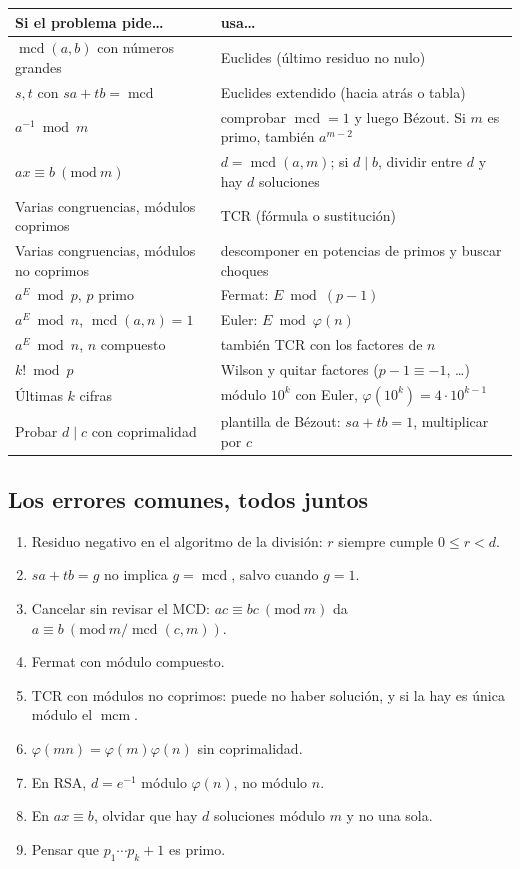 \documentclass[11pt,a4paper]{article}
\theoremstyle{definition}
\newcommand{\md}[1]{\ (\mathrm{mod}\ #1)}
\newcommand{\mcd}{\operatorname{mcd}}
\newcommand{\mcm}{\operatorname{mcm}}
\theoremstyle{notait}
\theoremstyle{nota}
\begin{document}
\begin{center}
\renewcommand{\arraystretch}{1.35}
\begin{tabular}{p{6.3cm}p{8.3cm}}
\toprule
\textbf{Si el problema pide\dots} & \textbf{usa\dots}\\
\midrule
$\mcd(a,b)$ con números grandes & Euclides (último residuo no nulo)\\
$s,t$ con $sa+tb=\mcd$ & Euclides extendido (hacia atrás o tabla)\\
$a^{-1}\bmod m$ & comprobar $\mcd=1$ y luego Bézout. Si $m$ es primo, también $a^{m-2}$\\
$ax\equiv b\md m$ & $d=\mcd(a,m)$; si $d\mid b$, dividir entre $d$ y hay $d$ soluciones\\
Varias congruencias, módulos coprimos & TCR (fórmula o sustitución)\\
Varias congruencias, módulos no coprimos & descomponer en potencias de primos y buscar choques\\
$a^E\bmod p$, $p$ primo & Fermat: $E\bmod(p-1)$\\
$a^E\bmod n$, $\mcd(a,n)=1$ & Euler: $E\bmod\varphi(n)$\\
$a^E\bmod n$, $n$ compuesto & también TCR con los factores de $n$\\
$k!\bmod p$ & Wilson y quitar factores ($p-1\equiv-1$, \dots)\\
Últimas $k$ cifras & módulo $10^k$ con Euler, $\varphi(10^k)=4\cdot10^{k-1}$\\
Probar $d\mid c$ con coprimalidad & plantilla de Bézout: $sa+tb=1$, multiplicar por $c$\\
\bottomrule
\end{tabular}
\end{center}

\subsection*{Los errores comunes, todos juntos}
\begin{enumerate}
\item Residuo negativo en el algoritmo de la división: $r$ siempre cumple $0\le r<d$.
\item $sa+tb=g$ no implica $g=\mcd$, salvo cuando $g=1$.
\item Cancelar sin revisar el MCD: $ac\equiv bc\md m$ da $a\equiv b\md{m/\mcd(c,m)}$.
\item Fermat con módulo compuesto.
\item TCR con módulos no coprimos: puede no haber solución, y si la hay es única módulo el $\mcm$.
\item $\varphi(mn)=\varphi(m)\varphi(n)$ sin coprimalidad.
\item En RSA, $d=e^{-1}$ módulo $\varphi(n)$, no módulo $n$.
\item En $ax\equiv b$, olvidar que hay $d$ soluciones módulo $m$ y no una sola.
\item Pensar que $p_1\cdots p_k+1$ es primo.
\end{enumerate}
\end{document}

